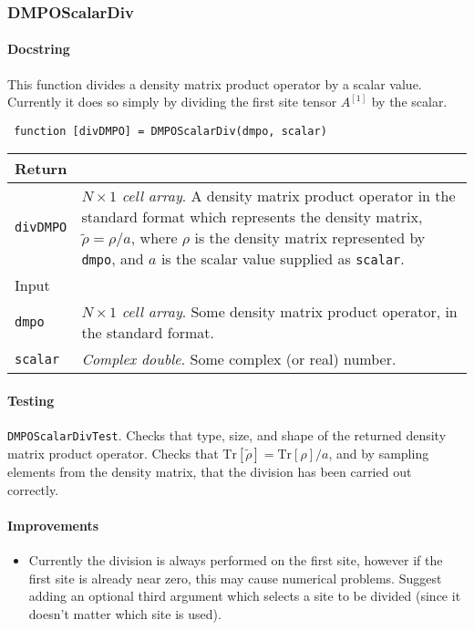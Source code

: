  \subsubsection{DMPOScalarDiv}
 \paragraph{Docstring} This function divides a density matrix product operator by a scalar value. Currently it does so simply by dividing the first site tensor \(A^{[1]}\) by the scalar.
 \begin{lstlisting}
 function [divDMPO] = DMPOScalarDiv(dmpo, scalar) \end{lstlisting}
 \begin{longtabu}{X[1,l]X[4,l]}
 \hline
 Return & \\ \hline
 \lstinline$divDMPO$ & \emph{\(N \times 1\) cell array}. A density matrix product operator in the standard format which represents the density matrix, \(\tilde{\rho} = \rho / a\), where \(\rho\) is the density matrix represented by \lstinline$dmpo$, and \(a\) is the scalar value supplied as \lstinline$scalar$. \\ \hline
 Input & \\ \hline
 \lstinline$dmpo$ & \emph{\(N \times 1\) cell array}. Some density matrix product operator, in the standard format. \\
 \lstinline$scalar$ & \emph{Complex double}. Some complex (or real) number. \\
 \hline
 \end{longtabu}
 \paragraph{Testing} \lstinline$DMPOScalarDivTest$. Checks that type, size, and shape of the returned density matrix product operator. Checks that \(\mathrm{Tr}[\tilde{\rho}] = \mathrm{Tr}[\rho] / a\), and by sampling elements from the density matrix, that the division has been carried out correctly.
 \paragraph{Improvements}
 \begin{itemize}
 \item Currently the division is always performed on the first site, however if the first site is already near zero, this may cause numerical problems. Suggest adding an optional third argument which selects a site to be divided (since it doesn't matter which site is used).
 \end{itemize}
 
